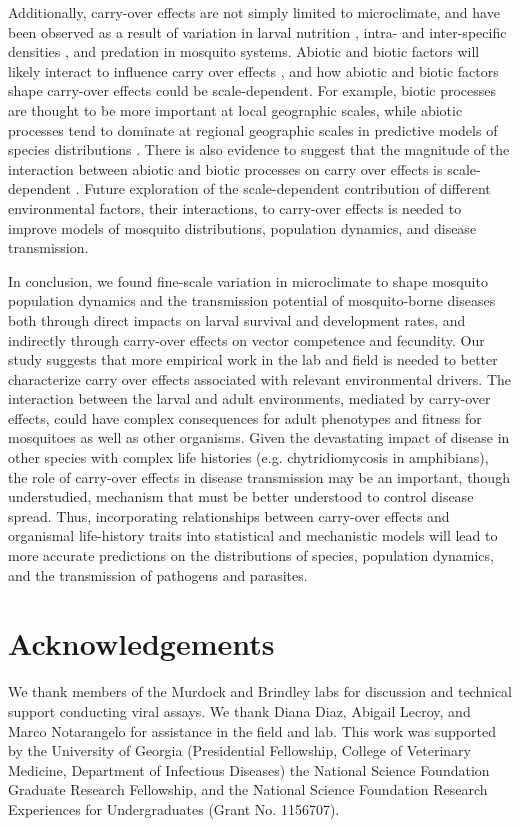 \documentclass[12pt]{article}
\begin{document}
Additionally, carry-over effects are not simply limited to microclimate, and have been observed as a result of variation in larval nutrition \citep{moller-jacobs2014}, intra- and inter-specific densities \citep{ alto2005, alto2008}, and predation \citep{roux2015a} in mosquito systems. Abiotic and biotic factors will likely interact to influence carry over effects \citep{buckner2016, muturi2011d, muturi2012a}, and how abiotic and biotic factors shape carry-over effects could be scale-dependent. For example, biotic processes are thought to be more important at local geographic scales, while abiotic processes tend to dominate at regional geographic scales in predictive models of species distributions \citep{cohen2016}. There is also evidence to suggest that the magnitude of the interaction between abiotic and biotic processes on carry over effects is scale-dependent \citep{leisnham2014}. Future exploration of the scale-dependent contribution of different environmental factors, their interactions, to carry-over effects is needed to improve models of mosquito distributions, population dynamics, and disease transmission.

In conclusion, we found fine-scale variation in microclimate to shape mosquito population dynamics and the transmission potential of mosquito-borne diseases both through direct impacts on larval survival and development rates, and indirectly through carry-over effects on vector competence and fecundity. Our study suggests that more empirical work in the lab and field is needed to better characterize carry over effects associated with relevant environmental drivers. The interaction between the larval and adult environments, mediated by carry-over effects, could have complex consequences for adult phenotypes and fitness for mosquitoes as well as other organisms. Given the devastating impact of disease in other species with complex life histories (e.g. chytridiomycosis in amphibians), the role of carry-over effects in disease transmission may be an important, though understudied, mechanism that must be better understood to control disease spread. Thus, incorporating relationships between carry-over effects and organismal life-history traits into statistical and mechanistic models will lead to more accurate predictions on the distributions of species, population dynamics, and the transmission of pathogens and parasites.

\section{Acknowledgements}
We thank members of the Murdock and Brindley labs for discussion and technical support conducting viral assays. We thank Diana Diaz, Abigail Lecroy, and Marco Notarangelo for assistance in the field and lab. This work was supported by the University of Georgia (Presidential Fellowship, College of Veterinary Medicine, Department of Infectious Diseases) the National Science Foundation Graduate Research Fellowship, and the National Science Foundation Research Experiences for Undergraduates (Grant No. 1156707).
\end{document}
